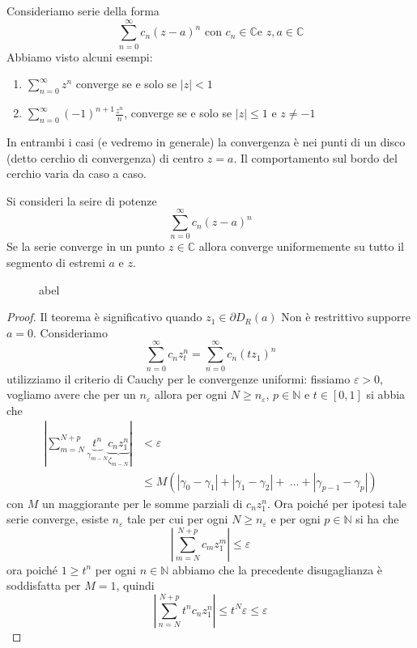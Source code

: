 Consideriamo serie della forma 
\[
\sum_{n=0}^{\infty} c_{n} {(z - a)}^{n} \text{ con } c_{n}\in \mathbb{C} \text{
e } z, a \in \mathbb{C}
\]
Abbiamo visto alcuni esempi:
\begin{enumerate}[label = \alph*)]
    \item \(\sum_{n=0}^{\infty} z^{n} \) converge se e solo se \(|z| < 1\)
    \item \(\sum_{n=0}^{\infty} {(-1)}^{n+1} \frac{z^{n}}{n} \), converge se e
        solo se \(|z| \le 1\) e \(z \neq -1\)  
\end{enumerate}
In entrambi i casi (e vedremo in generale) la convergenza è nei punti di un
disco (detto cerchio di convergenza) di centro \(z = a\). Il comportamento sul
bordo del cerchio varia da caso a caso.

\begin{theorem}[Abel]
    Si consideri la seire di potenze 
    \[
    \sum_{n=0}^{\infty} c_{n} {\left( z-a \right)}^{n}
    \]
    Se la serie converge in un punto \(z \in \mathbb{C}\) allora converge
    uniformemente su tutto il segmento di estremi \(a\) e \(z\).
\end{theorem}
\begin{figure}[ht]
    \centering
    \caption{abel}
    \label{fig:abel}
\end{figure}
\begin{proof}
    Il teorema è significativo quando \(z_{1} \in \partial D_R(a) \) 
    Non è restrittivo supporre \(a =0\). Consideriamo
    \[
        \sum_{n=0}^{\infty} c_{n} z^{n}_t = \sum_{n=0}^{\infty} c_{n}
        {(tz_{1})}^{n} 
    \]
    utilizziamo il criterio di Cauchy per le convergenze uniformi: fissiamo \(
    \varepsilon >0\),
    vogliamo avere che per un \(n_\varepsilon\) allora per ogni \(N \ge
    n_\varepsilon\), \(p \in \mathbb{N}\) e \(t \in [0, 1]\) si abbia che
    \begin{align*}
        \left|\sum_{m=N}^{N+p} \underbrace{t^{n}}_{\gamma_{m-N} }
        \underbrace{c_{n}z_{1}^{n}}_{\zeta_{m-N}} \right| &< \varepsilon \\
 &\le  M(|\gamma_0 - \gamma_{1}|
        + |\gamma_1 - \gamma_{2}| +~\dots + |\gamma_{p-1} - \gamma_{p}|) 
    \end{align*}
    con \(M\) un maggiorante per le somme parziali di \(c_{n}z_{1}^{n}\). Ora
    poiché per ipotesi tale serie converge, esiste \(n_\varepsilon\) tale per
    cui per ogni \(N \ge n_\varepsilon\) e per ogni \(p \in \mathbb{N}\) si ha
    che
    \[
        \left|\sum_{m=N}^{N+p} c_{m}z_{1}^{m} \right| \le \varepsilon
    \]
    ora poiché \(1 \ge t ^{n}\) per ogni \(n \in \mathbb{N}\) abbiamo che la
    precedente disugaglianza è soddisfatta per \(M = 1\), quindi
    \[
        \left| \sum_{n=N}^{N+p} t ^{n} c_{n} z_{1}^{n} \right| \le t ^{N}
        \varepsilon \le  \varepsilon
    \]
\end{proof}


